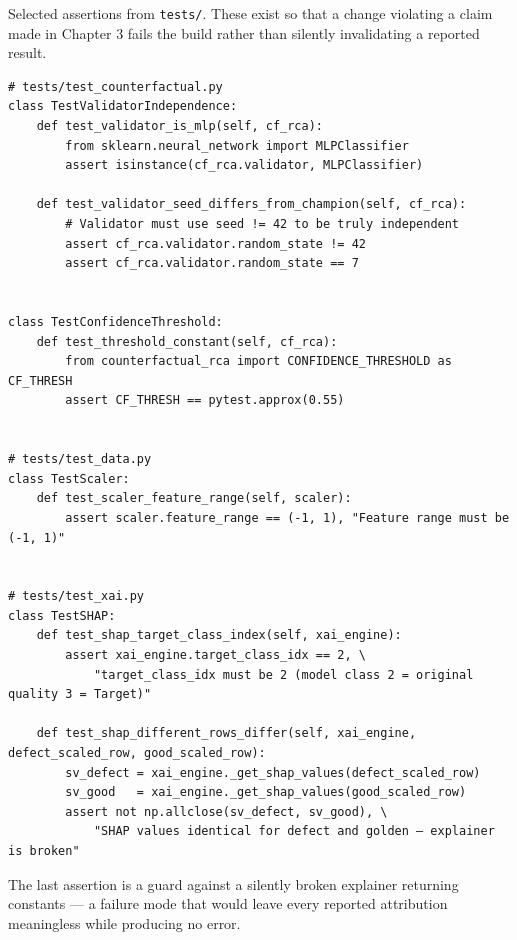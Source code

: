 Selected assertions from \texttt{tests/}. These exist so that a change violating a claim made in Chapter 3 fails the build rather than silently invalidating a reported result.

\begin{verbatim}
# tests/test_counterfactual.py
class TestValidatorIndependence:
    def test_validator_is_mlp(self, cf_rca):
        from sklearn.neural_network import MLPClassifier
        assert isinstance(cf_rca.validator, MLPClassifier)

    def test_validator_seed_differs_from_champion(self, cf_rca):
        # Validator must use seed != 42 to be truly independent
        assert cf_rca.validator.random_state != 42
        assert cf_rca.validator.random_state == 7


class TestConfidenceThreshold:
    def test_threshold_constant(self, cf_rca):
        from counterfactual_rca import CONFIDENCE_THRESHOLD as CF_THRESH
        assert CF_THRESH == pytest.approx(0.55)


# tests/test_data.py
class TestScaler:
    def test_scaler_feature_range(self, scaler):
        assert scaler.feature_range == (-1, 1), "Feature range must be (-1, 1)"


# tests/test_xai.py
class TestSHAP:
    def test_shap_target_class_index(self, xai_engine):
        assert xai_engine.target_class_idx == 2, \
            "target_class_idx must be 2 (model class 2 = original quality 3 = Target)"

    def test_shap_different_rows_differ(self, xai_engine, defect_scaled_row, good_scaled_row):
        sv_defect = xai_engine._get_shap_values(defect_scaled_row)
        sv_good   = xai_engine._get_shap_values(good_scaled_row)
        assert not np.allclose(sv_defect, sv_good), \
            "SHAP values identical for defect and golden — explainer is broken"
\end{verbatim}

The last assertion is a guard against a silently broken explainer returning constants --- a failure mode that would leave every reported attribution meaningless while producing no error.
